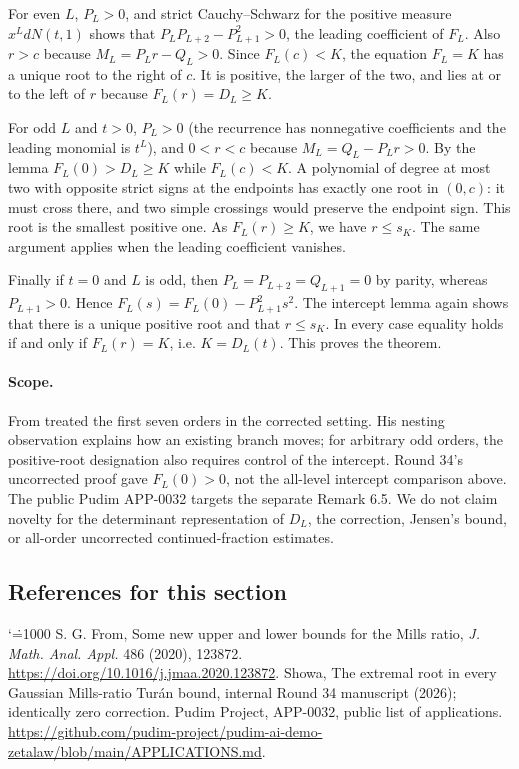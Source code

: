 \documentclass[11pt,a4paper]{article}
\makeatletter
\numberwithin{equation}{section}
\theoremstyle{definition}
\theoremstyle{remark}
\renewenvironment{thebibliography}[1]
 {\subsection*{References for this section}\small
  \list{\@biblabel{\@arabic\c@enumiv}}
       {\settowidth\labelwidth{\@biblabel{#1}}\leftmargin\labelwidth
        \advance\leftmargin\labelsep\@openbib@code
        \usecounter{enumiv}\let\p@enumiv\@empty
        \renewcommand\theenumiv{\@arabic\c@enumiv}}
  \sloppy\clubpenalty4000\widowpenalty4000\sfcode`\.=1000\relax}
 {\def\@noitemerr{\@latex@warning{Empty bibliography}}\endlist}
\makeatother
\begin{document}
For even $L$, $P_L>0$, and strict Cauchy--Schwarz for the positive measure $x^L dN(t,1)$ shows that $P_L P_{L+2}-P_{L+1}^2>0$, the leading coefficient of $F_L$. Also $r>c$ because $M_L=P_Lr-Q_L>0$. Since $F_L(c)<K$, the equation $F_L=K$ has a unique root to the right of $c$. It is positive, the larger of the two, and lies at or to the left of $r$ because $F_L(r)=D_L\ge K$.

For odd $L$ and $t>0$, $P_L>0$ (the recurrence has nonnegative coefficients and the leading monomial is $t^L$), and $0<r<c$ because $M_L=Q_L-P_Lr>0$. By the lemma $F_L(0)>D_L\ge K$ while $F_L(c)<K$. A polynomial of degree at most two with opposite strict signs at the endpoints has exactly one root in $(0,c)$: it must cross there, and two simple crossings would preserve the endpoint sign. This root is the smallest positive one. As $F_L(r)\ge K$, we have $r\le s_K$. The same argument applies when the leading coefficient vanishes.

Finally if $t=0$ and $L$ is odd, then $P_L=P_{L+2}=Q_{L+1}=0$ by parity, whereas $P_{L+1}>0$. Hence $F_L(s)=F_L(0)-P_{L+1}^2s^2$. The intercept lemma again shows that there is a unique positive root and that $r\le s_K$. In every case equality holds if and only if $F_L(r)=K$, i.e. $K=D_L(t)$. This proves the theorem.

\paragraph{Scope.} From treated the first seven orders in the corrected setting. His nesting observation explains how an existing branch moves; for arbitrary odd orders, the positive-root designation also requires control of the intercept. Round 34's uncorrected proof gave $F_L(0)>0$, not the all-level intercept comparison above. The public Pudim APP-0032 \cite{r35showa:pudim} targets the separate Remark 6.5. We do not claim novelty for the determinant representation of $D_L$, the correction, Jensen's bound, or all-order uncorrected continued-fraction estimates.
\begin{thebibliography}{9}
 S. G. From, Some new upper and lower bounds for the Mills ratio, \emph{J. Math. Anal. Appl.} 486 (2020), 123872. \url{https://doi.org/10.1016/j.jmaa.2020.123872}.
 Showa, The extremal root in every Gaussian Mills-ratio Tur\'an bound, internal Round 34 manuscript (2026); identically zero correction.
 Pudim Project, APP-0032, public list of applications. \url{https://github.com/pudim-project/pudim-ai-demo-zetalaw/blob/main/APPLICATIONS.md}.
\end{thebibliography}
\end{document}
